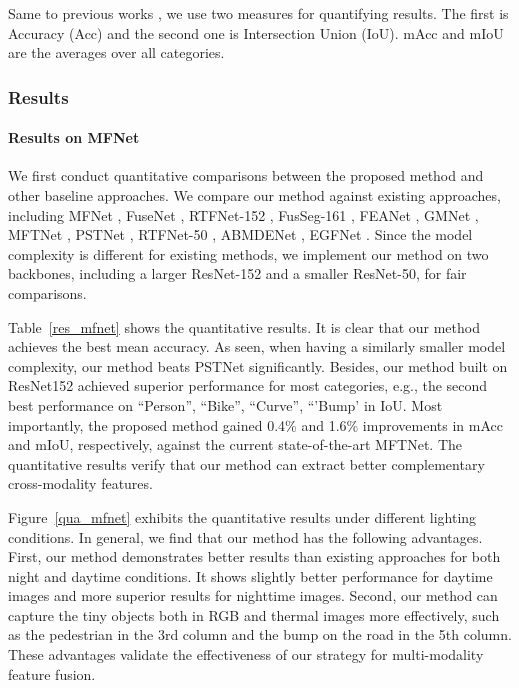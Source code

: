 \documentclass[letterpaper, 10 pt, journal, twoside]{IEEEtran}
\begin{document}
Same to previous works \cite{RTFNet}, we use two measures for quantifying results.
 The first is Accuracy (Acc) and the second one is Intersection Union (IoU). mAcc and mIoU are the averages over all categories.






\subsubsection{Results}
\paragraph{Results on MFNet}
We first conduct quantitative comparisons between the proposed method and other baseline approaches. We compare our method against existing approaches, including MFNet \cite{MFNet}, FuseNet \cite{Fusenet}, RTFNet-152 \cite{RTFNet}, FusSeg-161 \cite{FuseSeg}, FEANet \cite{FEANet}, GMNet \cite{GMNet}, MFTNet \cite{MFTNet}, PSTNet \cite{pst900}, RTFNet-50 \cite{RTFNet}, ABMDENet \cite{ABMDRNet}, EGFNet \cite{EGFNet}. Since the model complexity is different for existing methods, we implement our method on two backbones, including a larger ResNet-152 and a smaller ResNet-50, for fair comparisons. 

Table~\ref{res_mfnet} shows the quantitative results. It is clear that our method achieves the best mean accuracy.  As seen, when having a similarly smaller model complexity, our method beats PSTNet significantly. Besides,
our method built on ResNet152 achieved superior performance for most categories, e.g., the second best performance on ``Person'', ``Bike'', ``Curve'', ``'Bump' in IoU.
Most importantly,  the proposed method gained 0.4\% and 1.6\% improvements in mAcc and mIoU, respectively, against the current state-of-the-art MFTNet. 
The quantitative results verify that our method can extract better complementary cross-modality features.





Figure~\ref{qua_mfnet} exhibits the quantitative results under different lighting conditions. 
In general, we find that our method has the following advantages. First, our method demonstrates better results than existing approaches for both night and daytime
conditions. It shows slightly better performance for daytime images and more superior results for nighttime images. 
Second, our method can capture the tiny objects both in RGB and thermal images more effectively, such as the pedestrian in the 3rd column and the bump on the road in the 5th column. 
These advantages validate the effectiveness of our strategy for multi-modality feature fusion.
\end{document}

